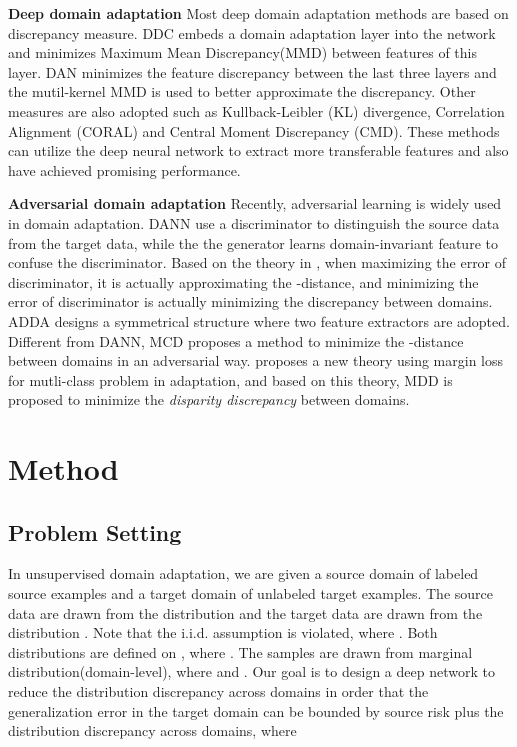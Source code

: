 \documentclass{ecai}
\begin{document}
\textbf{Deep domain adaptation} Most deep domain adaptation methods are based on discrepancy measure. DDC\cite{b29} embeds a domain adaptation layer into the network and minimizes Maximum Mean Discrepancy(MMD) between features of this layer. DAN\cite{b9} minimizes the feature discrepancy between the last three layers and  the mutil-kernel MMD is used to better approximate the discrepancy. Other measures are also adopted such as Kullback-Leibler (KL) divergence\cite{b26}, Correlation Alignment (CORAL)\cite{b25} and Central Moment Discrepancy (CMD)\cite{b27}. These methods can utilize the deep neural network to extract more transferable features and also have achieved promising performance.

\textbf{Adversarial domain adaptation}
Recently, adversarial learning is widely used in domain adaptation. DANN\cite{b18} use a discriminator to distinguish the source data from the target data, while the the generator learns domain-invariant feature to confuse the discriminator. Based on the theory in \cite{b3}, when maximizing the error of discriminator, it is actually approximating the -distance, and minimizing the error of discriminator is actually minimizing the discrepancy between domains. ADDA\cite{b33} designs a symmetrical structure where two feature extractors are adopted. Different from DANN, MCD\cite{b24} proposes a method to minimize the -distance between domains in an adversarial way. \cite{b37} proposes a new theory using margin loss for mutli-class problem in adaptation, and based on this theory, MDD is proposed to minimize the {\emph{disparity discrepancy}} between domains.





\section{Method}



\subsection{Problem Setting}
In unsupervised domain adaptation, we are given a source domain  of  labeled source examples and a target domain  of  unlabeled target examples. The source data are drawn from the distribution  and the target data are drawn from the distribution . Note that the i.i.d. assumption is violated, where . Both distributions are defined on , where .
  The samples are drawn from marginal distribution(domain-level), where  and . Our goal is to design a deep network  to reduce the distribution discrepancy across domains in order that the generalization error  in the target domain can be bounded by source risk  plus
   the distribution discrepancy across domains\cite{b3}, where
\end{document}
